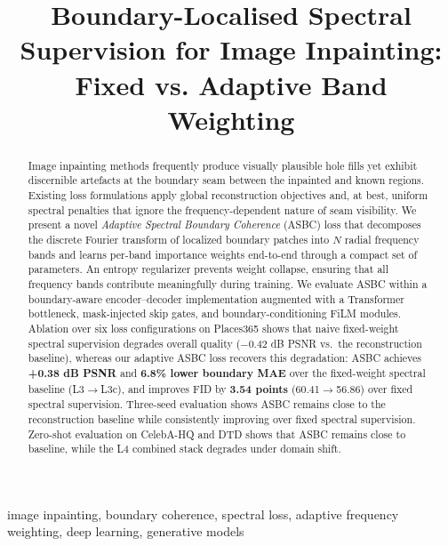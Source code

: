 \documentclass[10pt,conference]{IEEEtran}
\begin{document}
\title{Boundary-Localised Spectral Supervision for Image Inpainting: Fixed vs. Adaptive Band Weighting}

\author{
}

\maketitle

\begin{abstract}
Image inpainting methods frequently produce visually plausible hole fills yet
exhibit discernible artefacts at the boundary seam between the inpainted and
known regions.  Existing loss formulations apply global reconstruction
objectives and, at best, uniform spectral penalties that ignore the
frequency-dependent nature of seam visibility.  We present a novel
\emph{Adaptive Spectral Boundary Coherence} (ASBC) loss that decomposes the
discrete Fourier transform of localized boundary patches into $N$ radial
frequency bands and learns per-band importance weights end-to-end through a
compact set of parameters.  An entropy regularizer prevents weight collapse,
ensuring that all frequency bands contribute meaningfully during training.
We evaluate ASBC within a boundary-aware encoder--decoder implementation augmented
with a Transformer bottleneck, mask-injected skip gates, and
boundary-conditioning FiLM modules.  Ablation over six
loss configurations on Places365 shows that naive fixed-weight spectral
supervision degrades overall quality ($-0.42$ dB PSNR vs.\ the reconstruction
baseline), whereas our adaptive ASBC loss recovers this degradation:
ASBC achieves \textbf{+0.38 dB PSNR} and \textbf{6.8\% lower boundary MAE}
over the fixed-weight spectral baseline (L3$\to$L3c), and improves FID by
\textbf{3.54 points} (60.41$\to$56.86) over fixed spectral supervision.
Three-seed evaluation shows ASBC remains close to the reconstruction
baseline while consistently improving over fixed spectral supervision.
Zero-shot evaluation on CelebA-HQ and DTD shows that ASBC remains close
to baseline, while the L4 combined stack degrades under domain shift.
\end{abstract}

\begin{IEEEkeywords}
image inpainting, boundary coherence, spectral loss, adaptive frequency weighting,
deep learning, generative models
\end{IEEEkeywords}
\end{document}
